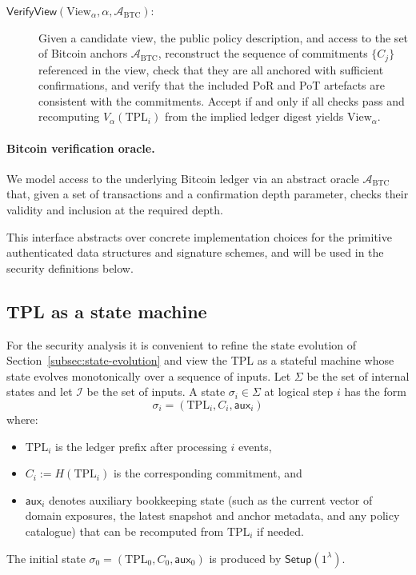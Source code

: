 \documentclass[11pt]{article}
\begin{document}
\begin{description}
  \item[$\mathsf{VerifyView}(\mathrm{View}_\alpha,\alpha,\mathcal{A}_{\mathrm{BTC}})$:]
  Given a candidate view, the public policy description, and access to the set of Bitcoin anchors $\mathcal{A}_{\mathrm{BTC}}$, reconstruct the sequence of commitments $\{C_j\}$ referenced in the view, check that they are all anchored with sufficient confirmations, and verify that the included PoR and PoT artefacts are consistent with the commitments.
  Accept if and only if all checks pass and recomputing $V_\alpha(\mathrm{TPL}_i)$ from the implied ledger digest yields $\mathrm{View}_\alpha$.
\end{description}
\paragraph{Bitcoin verification oracle.}
We model access to the underlying Bitcoin ledger via an abstract oracle $\mathcal{A}_{\mathrm{BTC}}$ that, given a set of transactions and a confirmation depth parameter, checks their validity and inclusion at the required depth.

This interface abstracts over concrete implementation choices for the primitive authenticated data structures and signature schemes, and will be used in the security definitions below.

\subsection{TPL as a state machine}
\label{subsec:tpl-state-machine}

For the security analysis it is convenient to refine the state evolution of Section~\ref{subsec:state-evolution}
and view the TPL as a stateful machine whose state evolves monotonically over a sequence of inputs.
Let $\Sigma$ be the set of internal states and let $\mathcal{I}$ be the set of inputs.
A state $\sigma_i \in \Sigma$ at logical step $i$ has the form
\[
  \sigma_i = (\mathrm{TPL}_i, C_i, \mathsf{aux}_i)
\]
where:
\begin{itemize}[noitemsep]
  \item $\mathrm{TPL}_i$ is the ledger prefix after processing $i$ events,
  \item $C_i := H(\mathrm{TPL}_i)$ is the corresponding commitment, and
  \item $\mathsf{aux}_i$ denotes auxiliary bookkeeping state
        (such as the current vector of domain exposures, the latest snapshot and anchor metadata,
        and any policy catalogue) that can be recomputed from $\mathrm{TPL}_i$ if needed.
\end{itemize}
The initial state $\sigma_0 = (\mathrm{TPL}_0, C_0, \mathsf{aux}_0)$ is produced by
$\mathsf{Setup}(1^\lambda)$.
\end{document}
